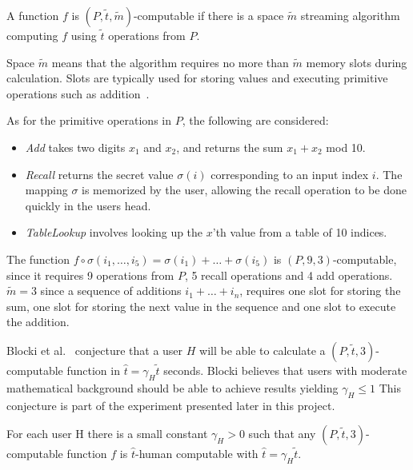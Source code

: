 \begin{definition}
    \label{ptm-computable}
    A function $f$ is $(P, \tilde t, \tilde m)$-computable if there is a space $\tilde m$ streaming algorithm computing $f$ using $\tilde t$ operations from $P$.
\end{definition}
\begin{remark}
    Space $\tilde m$ means that the algorithm requires no more than $\tilde m$ memory slots during calculation. Slots are typically used for storing values and executing primitive operations such as addition~\cite{space-complexity}.
\end{remark}



\noindent As for the primitive operations in $P$, the following are considered:
\begin{itemize}
    \item \emph{Add} takes two digits $x_1$ and $x_2$, and returns the sum $x_1 + x_2$ mod 10.
    \item \emph{Recall} returns the secret value $\sigma(i)$ corresponding to an input index $i$. The mapping $\sigma$ is memorized by the user, allowing the recall operation to be done quickly in the users head.
    \item \emph{TableLookup} involves looking up the $x$'th value from a table of 10 indices.
\end{itemize}

\begin{example}
    The function $f \circ \sigma(i_1,\dots,i_5) = \sigma(i_1) + \dots + \sigma(i_5)$ is $(P,9,3)$-computable, since it requires 9 operations from $P$, 5 recall operations and 4 add operations. $\tilde m=3$ since a sequence of additions $i_1 + \dots + i_n$, requires one slot for storing the sum, one slot for storing the next value in the sequence and one slot to execute the addition.
\end{example}

\par Blocki et al.~\cite{hcp-blocki} conjecture that a user $H$ will be able to calculate a $( P, \tilde t, 3 )$-computable function in $\hat t = \gamma_H \tilde t$ seconds. Blocki believes that users with moderate mathematical background should be able to achieve results yielding $\gamma_H \le 1$  This conjecture is part of the experiment presented later in this project. 


\begin{conjecture}\label{conjecture1}
    \cite{hcp-blocki} For each user H there is a small constant $\gamma_H > 0$ such that any $(P,\tilde t, 3)$-computable function $f$ is $\hat t$-human computable with $\hat t = \gamma_H \tilde t$.

\end{conjecture}

